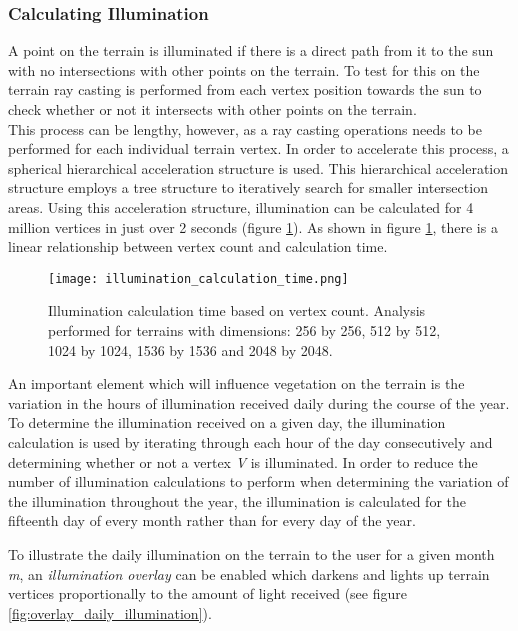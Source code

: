 \subsubsection{Calculating Illumination}

A point on the terrain is illuminated if there is a direct path from it to the sun with no intersections with other points on the terrain. To test for this on the terrain ray casting is performed from each vertex position towards the sun to check whether or not it intersects with other points on the terrain.\\
This process can be lengthy, however, as a ray casting operations needs to be performed for each individual terrain vertex. In order to accelerate this process, a spherical hierarchical acceleration structure is used. This hierarchical acceleration structure employs a tree structure to iteratively search for smaller intersection areas. Using this acceleration structure, illumination can be calculated for 4 million vertices in just over 2 seconds (figure \ref{fig:illumination_calculation_time}). As shown in figure \ref{fig:illumination_calculation_time}, there is a linear relationship between vertex count and calculation time. \\

\begin{figure}
\center
	\texttt{[image: illumination\_calculation\_time.png]}
	\caption{ Illumination calculation time based on vertex count. Analysis performed for terrains with dimensions: 256 by 256, 512 by 512, 1024 by 1024, 1536 by 1536 and 2048 by 2048. }
	\label{fig:illumination_calculation_time}
\end{figure}

An important element which will influence vegetation on the terrain is the variation in the hours of illumination received daily during the course of the year. To determine the illumination received on a given day, the illumination calculation is used by iterating through each hour of the day consecutively and determining whether or not a vertex \textit{V} is illuminated. In order to reduce the number of illumination calculations to perform when determining the variation of the illumination throughout the year, the illumination is calculated for the fifteenth day of every month rather than for every day of the year.

To illustrate the daily illumination on the terrain to the user for a given month \textit{m}, an \textit{illumination overlay} can be enabled which darkens and lights up terrain vertices proportionally to the amount of light received (see figure \ref{fig:overlay_daily_illumination}).

